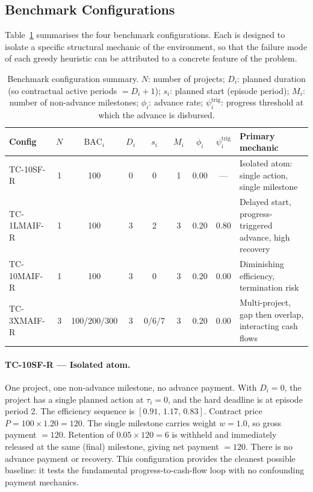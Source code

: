 \subsection{Benchmark Configurations}
\label{subsec:configs}

Table~\ref{tab:configs} summarises the four benchmark configurations.
Each is designed to isolate a specific structural mechanic of the
environment, so that the failure mode of each greedy heuristic can
be attributed to a concrete feature of the problem.

\begin{table}[htbp]
  \centering\small
  \renewcommand{\arraystretch}{1.3}
  \setlength{\tabcolsep}{4pt}
  \begin{tabular}{lcccccccl}
    \toprule
    \textbf{Config} & $N$ & $\mathrm{BAC}_i$ & $D_i$ & $s_i$ &
    $M_i$ & $\phi_i$ & $\psi^{\mathrm{trig}}_i$ & \textbf{Primary mechanic} \\
    \midrule
    TC-10SF-R   & 1 & 100       & 0 & 0       & 1 & 0.00 & ---  &
      Isolated atom: single action, single milestone \\
    TC-1LMAIF-R & 1 & 100       & 3 & 2       & 3 & 0.20 & 0.80 &
      Delayed start, progress-triggered advance, high recovery \\
    TC-10MAIF-R & 1 & 100       & 3 & 0       & 3 & 0.20 & 0.00 &
      Diminishing efficiency, termination risk \\
    TC-3XMAIF-R & 3 & 100/200/300 & 3 & 0/6/7 & 3 & 0.20 & 0.00 &
      Multi-project, gap then overlap, interacting cash flows \\
    \bottomrule
  \end{tabular}
  \caption{Benchmark configuration summary. $N$: number of projects;
    $D_i$: planned duration (so contractual active periods $= D_i+1$);
    $s_i$: planned start (episode period); $M_i$: number of non-advance
    milestones; $\phi_i$: advance rate; $\psi^{\mathrm{trig}}_i$:
    progress threshold at which the advance is disbursed.}
  \label{tab:configs}
\end{table}

\paragraph{TC-10SF-R --- Isolated atom.}
One project, one non-advance milestone, no advance payment.
With $D_i = 0$, the project has a single planned action at $\tau_i = 0$,
and the hard deadline is at episode period 2.  The efficiency
sequence is $[0.91,\, 1.17,\, 0.83]$.  Contract price
$P = 100 \times 1.20 = 120$.  The single milestone carries weight
$w = 1.0$, so gross payment $= 120$.  Retention of $0.05 \times 120 = 6$
is withheld and immediately released at the same (final) milestone,
giving net payment $= 120$.  There is no advance payment or recovery.
This configuration provides the cleanest possible baseline: it tests
the fundamental progress-to-cash-flow loop with no confounding payment
mechanics.

